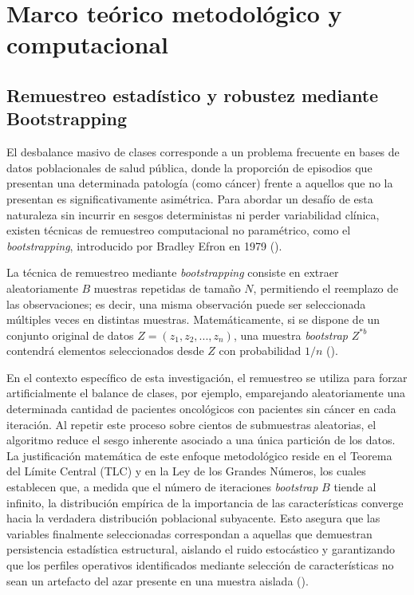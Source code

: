 

\section{Marco teórico metodológico y computacional}



\subsection{Remuestreo estadístico y robustez mediante Bootstrapping}

El desbalance masivo de clases corresponde a un problema frecuente en bases de datos poblacionales de salud pública, donde la proporción de episodios que presentan una determinada patología (como cáncer) frente a aquellos que no la presentan es significativamente asimétrica. Para abordar un desafío de esta naturaleza sin incurrir en sesgos deterministas ni perder variabilidad clínica, existen técnicas de remuestreo computacional no paramétrico, como el \textit{bootstrapping}, introducido por Bradley Efron en 1979 (\cite{efron1979bootstrap}).

La técnica de remuestreo mediante \textit{bootstrapping} consiste en extraer aleatoriamente $B$ muestras repetidas de tamaño $N$, permitiendo el reemplazo de las observaciones; es decir, una misma observación puede ser seleccionada múltiples veces en distintas muestras. Matemáticamente, si se dispone de un conjunto original de datos $Z = (z_1, z_2, ..., z_n)$, una muestra \textit{bootstrap} $Z^{*b}$ contendrá elementos seleccionados desde $Z$ con probabilidad $1/n$ (\cite{efron1979bootstrap, hastie2009elements}).

En el contexto específico de esta investigación, el remuestreo se utiliza para forzar artificialmente el balance de clases, por ejemplo, emparejando aleatoriamente una determinada cantidad de pacientes oncológicos con pacientes sin cáncer en cada iteración. Al repetir este proceso sobre cientos de submuestras aleatorias, el algoritmo reduce el sesgo inherente asociado a una única partición de los datos. La justificación matemática de este enfoque metodológico reside en el Teorema del Límite Central (TLC) y en la Ley de los Grandes Números, los cuales establecen que, a medida que el número de iteraciones \textit{bootstrap} $B$ tiende al infinito, la distribución empírica de la importancia de las características converge hacia la verdadera distribución poblacional subyacente. Esto asegura que las variables finalmente seleccionadas correspondan a aquellas que demuestran persistencia estadística estructural, aislando el ruido estocástico y garantizando que los perfiles operativos identificados mediante selección de características no sean un artefacto del azar presente en una muestra aislada (\cite{hastie2009elements}).


